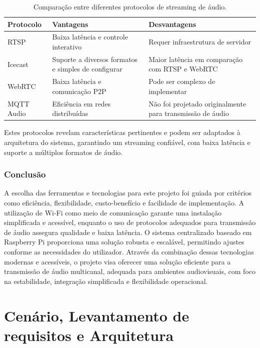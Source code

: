 \documentclass{article}
\begin{document}
\begin{table}[h]
    \centering
    \begin{tabular}{@{}l p{5cm} p{5cm}@{}}
        \toprule
        \textbf{Protocolo} & \textbf{Vantagens} & \textbf{Desvantagens} \\
        \midrule
        RTSP & Baixa lat\^encia e controle interativo & Requer infraestrutura de servidor \\
        Icecast & Suporte a diversos formatos e simples de configurar & Maior lat\^encia em compara\c{c}\~ao com RTSP e WebRTC \\
        WebRTC & Baixa lat\^encia e comunica\c{c}\~ao P2P & Pode ser complexo de implementar \\
        MQTT Audio & Efici\^encia em redes distribu\'idas & N\~ao foi projetado originalmente para transmiss\~ao de \'audio \\
        \bottomrule
    \end{tabular}
    \caption{Compara\c{c}\~ao entre diferentes protocolos de streaming de \'audio.}
    \label{tab:comparacao_protocolos_audio}
\end{table}

Estes protocolos revelam características pertinentes e podem ser adaptados à arquitetura do sistema, garantindo um streaming confiável, com baixa latência e suporte a múltiplos formatos de áudio.

\subsubsection{Conclusão} A escolha das ferramentas e tecnologias para este projeto foi guiada por critérios como eficiência, flexibilidade, custo-benefício e facilidade de implementação. A utilização de Wi-Fi como meio de comunicação garante uma instalação simplificada e acessível, enquanto o uso de protocolos adequados para transmissão de áudio assegura qualidade e baixa latência. O sistema centralizado baseado em Raspberry Pi proporciona uma solução robusta e escalável, permitindo ajustes conforme as necessidades do utilizador.
Através da combinação dessas tecnologias modernas e acessíveis, o projeto visa oferecer uma solução eficiente para a transmissão de áudio multicanal, adequada para ambientes audiovisuais, com foco na estabilidade, integração simplificada e flexibilidade operacional.





\newpage


\section{Cenário, Levantamento de requisitos e Arquitetura}
\end{document}
